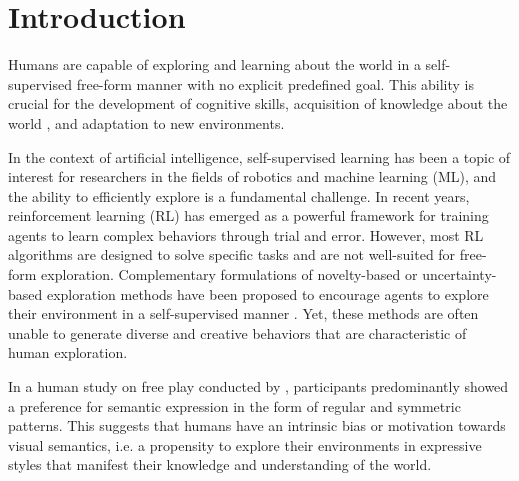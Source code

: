 \section{Introduction}
\label{sec:introduction}

Humans are capable of exploring and learning about the world in a self-supervised free-form manner with no explicit predefined goal. 
This ability is crucial for the development of cognitive skills, acquisition of knowledge about the world \citep{exploration,chu2020play}, and adaptation to new environments.


In the context of artificial intelligence, self-supervised learning has been a topic of interest for researchers in the fields of robotics and machine learning (ML), and the ability to efficiently explore is a fundamental challenge.
In recent years, reinforcement learning (RL) has emerged as a powerful framework for training agents to learn complex behaviors through trial and error.
However, most RL algorithms are designed to solve specific tasks and are not well-suited for free-form exploration.
Complementary formulations of novelty-based or uncertainty-based exploration methods have been proposed to encourage agents to explore their environment in a self-supervised manner \citep{rnd,icm,disagreement,exploration_survey}. 
Yet, these methods are often unable to generate diverse and creative behaviors that are characteristic of human exploration.

In a human study on free play conducted by \citet{diggs}, participants predominantly showed a preference for semantic expression in the form of regular and symmetric patterns.
This suggests that humans have an intrinsic bias or motivation towards visual semantics, i.e. a propensity to explore their environments in expressive styles that manifest their knowledge and understanding of the world.


